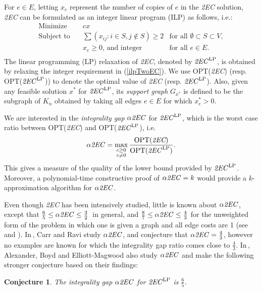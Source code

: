\documentclass[oneeqnum,final]{siamltex1213}
\newcommand{\TwoEC}{\emph{2EC}}
\newcommand{\TwoECLP}{\ensuremath{\text{\TwoEC}^{\text{LP}}}}
\newcommand{\alphaTwoEC}{\ensuremath{\alpha\text{\TwoEC}}}
\newcommand{\Kn}{\ensuremath{K_{n}}}
\newcommand{\Gx}{\ensuremath{G_{x^{*}}}}
\newtheorem{conjecture}{Conjecture}
\begin{document}
For $e\in E$, letting $x_{e}$ represent the number of copies of $e$ in the \TwoEC{} solution, \TwoEC{} can be formulated as an integer linear program (ILP) as follows, i.e.:\begin{equation}\label{ilpTwoEC}
     \begin{aligned}
      \text{Minimize}\quad & cx&  \\
      \text{Subject to}\quad &\sum(x_{ij}:i\in S, j\notin S) \geq 2 &\text{for all } \emptyset \subset S \subset V,\\
       & x_e \ge 0\text{, and integer} &\text{for all } e \in E. \\
     \end{aligned}
\end{equation}
\noindent The linear programming (LP) relaxation of \TwoEC{}, denoted by \TwoECLP, is obtained by relaxing the integer requirement in (\ref{ilpTwoEC}). We use OPT(\TwoEC{}) (resp. OPT(\TwoECLP)) to denote the optimal value of \TwoEC{} (resp. \TwoECLP). Also, given any feasible solution $x^{*}$ for \TwoECLP, its \emph{support graph} \Gx{} is defined to be the subgraph of \Kn{} obtained by taking all edges $e\in E$ for which $x^{*}_{e}>0$.

We are interested in the \emph{integrality gap} \alphaTwoEC{} for \TwoECLP, which is the worst case ratio between OPT(\TwoEC) and OPT(\TwoECLP), i.e. \[\alphaTwoEC=\max_{\substack{c\geq 0\\c\neq 0}} \frac{\text{OPT(}\TwoEC\text{)}}{\text{OPT(}\TwoECLP\text{)}}\text{.}\] This gives a measure of the quality of the lower bound provided by \TwoECLP. Moreover, a polynomial-time constructive proof of $\alphaTwoEC=k$ would provide a $k$-approximation algorithm for \alphaTwoEC.

Even though \TwoEC{} has been intensively studied, little is known about \alphaTwoEC, except that ${\frac{6}{5}\le\alphaTwoEC\le\frac{3}{2}}$\,\cite{alexander} in general, and $\frac{8}{7}\leq\alphaTwoEC\leq\frac{4}{3}$ for the unweighted form of the problem in which one is given a graph and all edge costs are 1 (see\,\cite{boyd} and \cite{sebo}). In\,\cite{carr}, Carr and Ravi study \alphaTwoEC{}, and conjecture that $\alphaTwoEC{} = \frac{4}{3}$, however no examples are known for which the integrality gap ratio comes close to $\frac{4}{3}$. In\,\cite{alexander}, Alexander, Boyd and Elliott-Magwood also study \alphaTwoEC{} and make the following stronger conjecture based on their findings:

\begin{conjecture}\cite{alexander}\label{conjecture}
The integrality gap \alphaTwoEC{} for \TwoECLP{} is $\frac{6}{5}$.
\end{conjecture}
\end{document}
